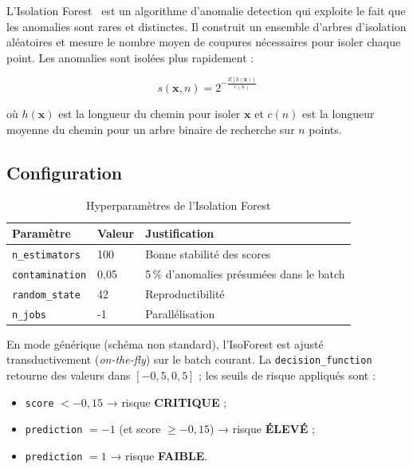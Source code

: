 \documentclass[12pt,a4paper,twoside]{report}
\theoremstyle{definition}
\begin{document}
L'Isolation Forest~\cite{liu2008isolation} est un algorithme d'anomalie detection
qui exploite le fait que les anomalies sont rares et distinctes. Il construit un
ensemble d'arbres d'isolation aléatoires et mesure le nombre moyen de coupures
nécessaires pour isoler chaque point. Les anomalies sont isolées plus rapidement :

\begin{equation}
s(\mathbf{x}, n) = 2^{-\frac{E[h(\mathbf{x})]}{c(n)}}
\label{eq:isoforest_score}
\end{equation}

où $h(\mathbf{x})$ est la longueur du chemin pour isoler $\mathbf{x}$ et $c(n)$
est la longueur moyenne du chemin pour un arbre binaire de recherche sur $n$ points.

\subsection{Configuration}

\begin{table}[H]
\centering
\caption{Hyperparamètres de l'Isolation Forest}
\label{tab:isoforest_params}
\renewcommand{\arraystretch}{1.3}
\begin{tabular}{lll}
\toprule
\textbf{Paramètre} & \textbf{Valeur} & \textbf{Justification} \\
\midrule
\texttt{n\_estimators} & 100 & Bonne stabilité des scores \\
\texttt{contamination} & 0,05 & 5\,\% d'anomalies présumées dans le batch \\
\texttt{random\_state} & 42  & Reproductibilité \\
\texttt{n\_jobs}       & -1  & Parallélisation \\
\bottomrule
\end{tabular}
\end{table}

En mode générique (schéma non standard), l'IsoForest est ajusté transductivement
(\textit{on-the-fly}) sur le batch courant. La \texttt{decision\_function} retourne
des valeurs dans $[-0{,}5, 0{,}5]$ ; les seuils de risque appliqués sont :
\begin{itemize}
  \item \texttt{score} $< -0{,}15$ → risque \textbf{CRITIQUE} ;
  \item \texttt{prediction} $= -1$ (et score $\geq -0{,}15$) → risque \textbf{ÉLEVÉ} ;
  \item \texttt{prediction} $= 1$ → risque \textbf{FAIBLE}.
\end{itemize}
\end{document}
